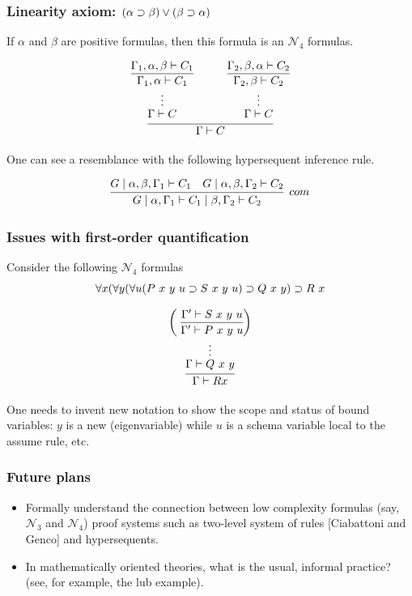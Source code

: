 \documentclass[9pt]{beamer}
\begin{document}
\begin{frame}
\frametitle{Linearity axiom: $(\alpha\supset\beta)\vee(\beta\supset\alpha)$}


If $\alpha$ and $\beta$ are positive formulas, then this formula is an 
$\mathcal{N}_4$ formulas.

\[
\infer{\Gamma\vdash C}
      {\deduce{\Gamma\vdash C\strut}
              {\deduce{\vdots}
                      {\infer{\Gamma_1,\alpha\vdash C_1}{\Gamma_1,\alpha,\beta\vdash C_1}}}\quad&\quad
       \deduce{\Gamma\vdash C\strut}
              {\deduce{\vdots}
                             {\infer{\Gamma_2,\beta\vdash C_2}{\Gamma_2,\beta,\alpha\vdash C_2}}}}
\]

One can see a resemblance with the following hypersequent inference rule.

\[
  \infer[com]
        {G\mid \alpha,\Gamma_1\vdash C_1\mid \beta,\Gamma_2\vdash C_2}
        {G\mid \alpha,\beta,\Gamma_1\vdash C_1 & G\mid  \alpha,\beta,\Gamma_2\vdash C_2}
\]


\end{frame}

\begin{frame}
\frametitle{Issues with first-order quantification}

Consider the following $\mathcal{N}_4$ formulas
\[
  \forall x(\forall y(\forall u(P~x~y~u\supset S~x~y~u)\supset Q~x~y)\supset R~x
\]

\bigskip

\[
  \infer{\Gamma\vdash R x}
        {\deduce{\Gamma\vdash Q~x~y\strut}
                {\deduce{\vdots}
                        {\left(~\vcenter{
                              \infer{\Gamma'\vdash P~x~y~u}
                                    {\Gamma'\vdash S~x~y~u}}
                         \right)}}}
\]

\bigskip

One needs to invent new notation to show the scope and status of bound
variables: $y$ is a new (eigenvariable) while $u$ is a schema variable
local to the assume rule, etc.

\end{frame}

\begin{frame}
\frametitle{Future plans}

\begin{itemize}

\item Formally understand the connection between low complexity
  formulas (say, $\mathcal{N}_3$ and $\mathcal{N}_4$) proof systems
  such as two-level system of rules [Ciabattoni and Genco] and
  hypersequents.

\vfill
\item In mathematically oriented theories, what is the usual, informal
  practice?  (see, for example, the lub example).

\vfill  
\vfill
\end{itemize}
\end{frame}
\end{document}
